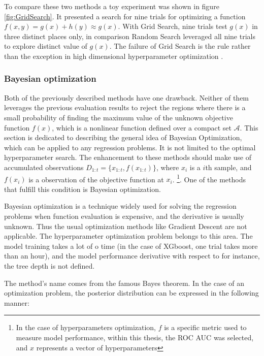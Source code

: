 To compare these two methods a toy experiment was shown in figure \ref{fig:GridSearch}. It presented a search for nine trials for optimizing a function \\ $f(x,y) = g(x) + h(y) \approx g(x)$. With Grid Search, nine trials test $g(x)$ in three distinct places only, in comparison Random Search leveraged all nine trials to explore distinct value of $g(x)$. The failure of Grid Search is the rule rather than the exception in high dimensional hyperparameter optimization \cite{RandomSearch}. 
 


\subsubsection{Bayesian optimization}
\label{sec:BayesOpt}
Both of the previously described methods have one drawback. Neither of them leverages the previous evaluation results to reject the regions where there is a small probability of finding the maximum value of the unknown objective function $f(x)$, which is a nonlinear function defined over a compact set $\mathcal{A}$. This section is dedicated to describing the general idea of Bayesian Optimization, which can be applied to any regression problems. It is not limited to the optimal hyperparameter search. The enhancement to these methods should make use of accumulated observations $D_{1:t} = \{ x_{1:t}, f(x_{1:t}) \}$, where $x_i$ is a $i$th sample, and $f(x_i)$ is a observation of the objective function at $x_i$.   \footnote{In the case of hyperparameters optimization, $f$ is a specific metric used to measure model performance, within this thesis, the ROC AUC was selected,  and $x$ represents a vector of hyperparameters }. One of the methods that fulfill this condition is Bayesian optimization.  
 
Bayesian optimization is a technique widely used for solving the regression problems when function evaluation is expensive, and the derivative is usually unknown. Thus the usual optimization methods like Gradient Descent are not applicable. The hyperparameter optimization problem belongs to this area. The model training takes a lot of o time (in the case of XGboost, one trial takes more than an hour), and the model performance derivative with respect to for instance, the tree depth is not defined. 

The method's name comes from the famous Bayes theorem. In the case of an optimization problem, the posterior distribution can be expressed in the following manner: 

